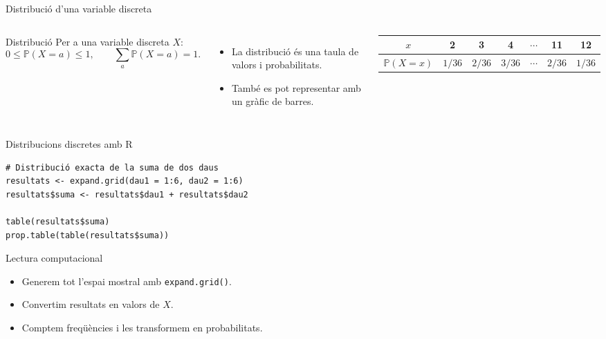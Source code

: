 \documentclass[10pt,aspectratio=169]{beamer}
\newcommand{\Prob}{\mathbb{P}}
\begin{document}
\begin{frame}{Distribució d'una variable discreta}
\begin{columns}[T]
\begin{block}{Distribució}
Per a una variable discreta $X$:
\[
0\leq \Prob(X=a)\leq 1,
\qquad
\sum_a \Prob(X=a)=1.
\]
\end{block}
\begin{itemize}
  \item La distribució és una taula de valors i probabilitats.
  \item També es pot representar amb un gràfic de barres.
\end{itemize}
\begin{center}
\begin{tabular}{c|cccccc}
\toprule
$x$ & 2 & 3 & 4 & $\cdots$ & 11 & 12 \\
\midrule
$\Prob(X=x)$ & $1/36$ & $2/36$ & $3/36$ & $\cdots$ & $2/36$ & $1/36$ \\
\bottomrule
\end{tabular}
\end{center}
\vspace{0.2cm}
\end{columns}
\end{frame}

\begin{frame}[fragile]{Distribucions discretes amb R}
\begin{lstlisting}
# Distribució exacta de la suma de dos daus
resultats <- expand.grid(dau1 = 1:6, dau2 = 1:6)
resultats$suma <- resultats$dau1 + resultats$dau2

table(resultats$suma)
prop.table(table(resultats$suma))
\end{lstlisting}

\vspace{0.2cm}
\begin{block}{Lectura computacional}
\begin{itemize}
  \item Generem tot l'espai mostral amb \texttt{expand.grid()}.
  \item Convertim resultats en valors de $X$.
  \item Comptem freqüències i les transformem en probabilitats.
\end{itemize}
\end{block}
\end{frame}
\end{document}
